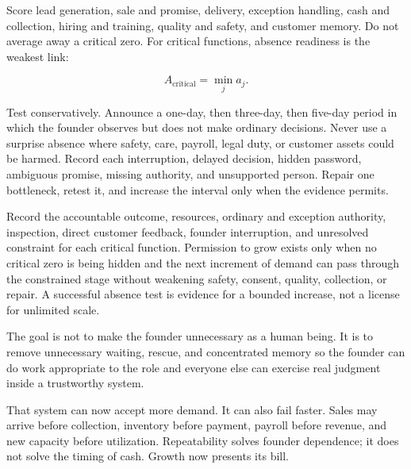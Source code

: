 Score lead generation, sale and promise, delivery, exception handling, cash and
collection, hiring and training, quality and safety, and customer memory. Do
not average away a critical zero. For critical functions, absence readiness is
the weakest link:

\begin{equation}
A_{\mathrm{critical}}=\min_j a_j.
\end{equation}

Test conservatively. Announce a one-day, then three-day, then five-day period
in which the founder observes but does not make ordinary decisions. Never use
a surprise absence where safety, care, payroll, legal duty, or customer assets
could be harmed. Record each interruption, delayed decision, hidden password,
ambiguous promise, missing authority, and unsupported person. Repair one
bottleneck, retest it, and increase the interval only when the evidence permits.

Record the accountable outcome, resources, ordinary and exception authority,
inspection, direct customer feedback, founder interruption, and unresolved
constraint for each critical function. Permission to grow exists only when no
critical zero is being hidden and the next increment of demand can pass through
the constrained stage without weakening safety, consent, quality, collection,
or repair. A successful absence test is evidence for a bounded increase, not a
license for unlimited scale.

The goal is not to make the founder unnecessary as a human being. It is to
remove unnecessary waiting, rescue, and concentrated memory so the founder can
do work appropriate to the role and everyone else can exercise real judgment
inside a trustworthy system.

That system can now accept more demand. It can also fail faster. Sales may
arrive before collection, inventory before payment, payroll before revenue, and
new capacity before utilization. Repeatability solves founder dependence; it
does not solve the timing of cash. Growth now presents its bill.
